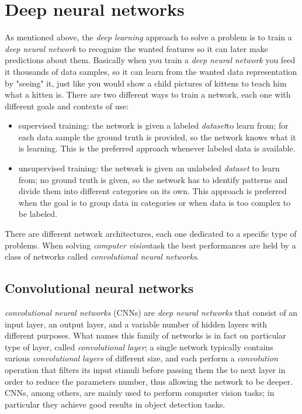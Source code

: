 \section{Deep neural networks}
	As mentioned above, the \emph{deep learning} approach to solve a problem is to train a \emph{deep neural network} to recognize the wanted features so it can later make predictions about them. Basically when you train a \emph{deep neural network} you feed it thousands of data samples, so it can learn from the wanted data representation by "seeing" it, just like you would show a child pictures of kittens to teach him what a kitten is.
	There are two different ways to train a network, each one with different goals and contexts of use:
	\begin{itemize}
		\item supervised training: the network is given a labeled \emph{\gls{dataset}}\glsfirstoccur to learn from; for each data sample the ground truth is provided, so the network knows what it is learning. This is the preferred approach whenever labeled data is available.
		\item unsupervised training: the network is given an unlabeled \emph{dataset} to learn from; no ground truth is given, so the network has to identify patterns and divide them into different categories on its own. This approach is preferred when the goal is to group data in categories or when data is too complex to be labeled.
	\end{itemize}
	There are different network architectures, each one dedicated to a specific type of problems. When solving  \emph{\gls{computer vision}}\glsfirstoccur task the best performances are held by a class of networks called \emph{convolutional neural networks}. \\

	\subsection{Convolutional neural networks}
	\emph{convolutional neural networks} (CNNs) are \emph{deep neural networks} that consist of an input layer, an output layer, and a variable number of hidden layers with different purposes. What names this family of networks is in fact on particular type of layer, called \emph{convolutional layer}; a single network typically contains various \emph{convolutional layers} of different size, and each perform a \emph{convolution} operation that filters its input stimuli before passing them the to next layer in order to reduce the parameters number, thus allowing the network to be deeper. \\
	CNNs, among others, are mainly used to perform computer vision tasks; in particular they achieve good results in object detection tasks. \\

